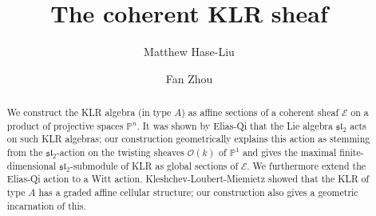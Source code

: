 \documentclass[11pt,reqno]{amsart}
\title{The coherent KLR sheaf} %
\author{Matthew Hase-Liu}
\author{Fan Zhou}
\begin{document}
\maketitle

\vspace*{-0.25in}


\vspace*{0.15in}






\begin{abstract}
    We construct the KLR algebra (in type $A$) as affine sections of a coherent sheaf $\mathcal{E}$ on a product of projective spaces $\mathbb{P}^n$. It was shown by Elias-Qi that the Lie algebra $\mathfrak{sl}_2$ acts on such KLR algebras; our construction geometrically explains this action as stemming from the $\mathfrak{sl}_2$-action on the twisting sheaves $\mathcal{O}(k)$ of $\mathbb{P}^1$ and gives the maximal finite-dimensional $\mathfrak{sl}_2$-submodule of KLR as global sections of $\mathcal{E}$. We furthermore extend the Elias-Qi action to a Witt action. Kleshchev-Loubert-Miemietz showed that the KLR of type $A$ has a graded affine cellular structure; our construction also gives a geometric incarnation of this.
\end{abstract}
\end{document}
